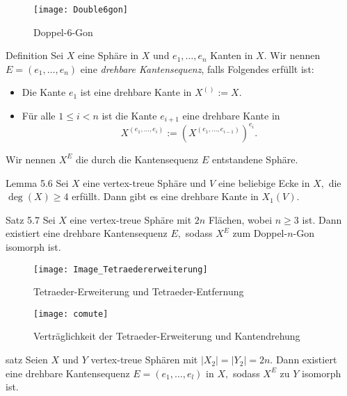 \documentclass{beamer}
\begin{document}
\begin{figure}[H]
\begin{center}
\texttt{[image: Double6gon]}
\end{center}
\caption{Doppel-6-Gon}
\end{figure}
\begin{frame}

\begin{block}{Definition}
Sei $X$ eine Sphäre in $X$ und $e_1,\ldots,e_n$ Kanten in $X$. Wir nennen $E=(e_1,\ldots,e_n)$ eine \emph{drehbare Kantensequenz}, falls Folgendes erfüllt ist: 
\begin{itemize}
\item Die Kante $e_1$ ist eine drehbare Kante in $X^{()}:=X.$ 
\item Für alle $1\leq i < n$ ist die Kante $e_{i+1}$ eine drehbare Kante in 
\[
X^{(e_1,\ldots,e_i)}:=(X^{(e_1,\ldots,e_{i-1})})^{e_i}.
\] 
\end{itemize}
Wir nennen $X^E$ die durch die Kantensequenz $E$ entstandene Sphäre. 
\end{block}
\end{frame}
\begin{frame}
\begin{block}{Lemma 5.6}
Sei $X$ eine vertex-treue Sphäre und $V$ eine beliebige Ecke in $X,$ die $\deg(X)\geq 4$ erfüllt. Dann gibt es eine drehbare Kante in $X_1(V).$ 
\end{block}
\end{frame}
\begin{frame}
\begin{block}{Satz 5.7}
Sei $X$ eine vertex-treue Sphäre mit $2n$ Flächen, wobei $n\geq 3$ ist. Dann existiert eine drehbare Kantensequenz $E,$ sodass $X^E$ zum Doppel-$n$-Gon isomorph ist. 
\end{block}
\end{frame}
\begin{frame}
\begin{figure}[H]
\begin{center}
\texttt{[image: Image\_Tetraedererweiterung]}
\end{center}
\caption{Tetraeder-Erweiterung und Tetraeder-Entfernung}
\end{figure}
\end{frame}
\begin{frame}
\begin{figure}[H]
\texttt{[image: comute]}
\caption{Verträglichkeit der Tetraeder-Erweiterung und Kantendrehung}
\end{figure}
\end{frame}
\begin{frame}
\begin{block}{satz}
Seien $X$ und $Y$ vertex-treue Sphären mit $\vert X_2\vert=\vert Y_2\vert=2n$.
Dann existiert eine drehbare Kantensequenz $E=(e_1,\ldots,e_l)$ in $X,$ sodass  $X^E$ zu $Y$ isomorph ist. 
\end{block}
\end{frame}
\end{document}
